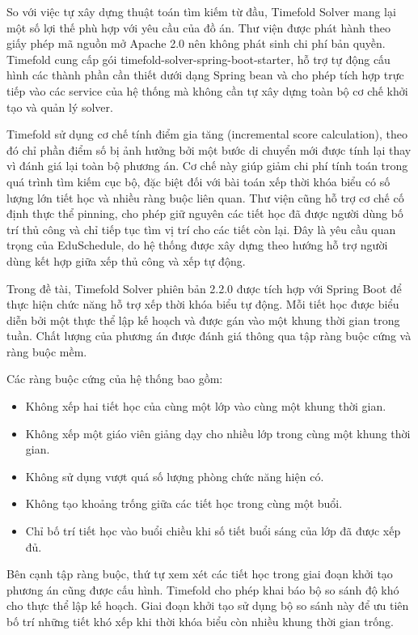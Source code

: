 \documentclass[../DoAn.tex]{subfiles}
\begin{document}
So với việc tự xây dựng thuật toán tìm kiếm từ đầu, Timefold Solver mang lại một số lợi thế phù hợp với yêu cầu của đồ án. Thư viện được phát hành theo giấy phép mã nguồn mở Apache 2.0 nên không phát sinh chi phí bản quyền. Timefold cung cấp gói timefold-solver-spring-boot-starter, hỗ trợ tự động cấu hình các thành phần cần thiết dưới dạng Spring bean và cho phép tích hợp trực tiếp vào các service của hệ thống mà không cần tự xây dựng toàn bộ cơ chế khởi tạo và quản lý solver.

Timefold sử dụng cơ chế tính điểm gia tăng (incremental score calculation), theo đó chỉ phần điểm số bị ảnh hưởng bởi một bước di chuyển mới được tính lại thay vì đánh giá lại toàn bộ phương án. Cơ chế này giúp giảm chi phí tính toán trong quá trình tìm kiếm cục bộ, đặc biệt đối với bài toán xếp thời khóa biểu có số lượng lớn tiết học và nhiều ràng buộc liên quan. Thư viện cũng hỗ trợ cơ chế cố định thực thể pinning, cho phép giữ nguyên các tiết học đã được người dùng bố trí thủ công và chỉ tiếp tục tìm vị trí cho các tiết còn lại. Đây là yêu cầu quan trọng của EduSchedule, do hệ thống được xây dựng theo hướng hỗ trợ người dùng kết hợp giữa xếp thủ công và xếp tự động.

Trong đề tài, Timefold Solver phiên bản 2.2.0 được tích hợp với Spring Boot để thực hiện chức năng hỗ trợ xếp thời khóa biểu tự động. Mỗi tiết học được biểu diễn bởi một thực thể lập kế hoạch và được gán vào một khung thời gian trong tuần. Chất lượng của phương án được đánh giá thông qua tập ràng buộc cứng và ràng buộc mềm.

Các ràng buộc cứng của hệ thống bao gồm:

\begin{itemize}[noitemsep]
\item Không xếp hai tiết học của cùng một lớp vào cùng một khung thời gian.
\item Không xếp một giáo viên giảng dạy cho nhiều lớp trong cùng một khung thời gian.
\item Không sử dụng vượt quá số lượng phòng chức năng hiện có.
\item Không tạo khoảng trống giữa các tiết học trong cùng một buổi.
\item Chỉ bố trí tiết học vào buổi chiều khi số tiết buổi sáng của lớp đã được xếp đủ.
\end{itemize}

Bên cạnh tập ràng buộc, thứ tự xem xét các tiết học trong giai đoạn khởi tạo phương án cũng được cấu hình. Timefold cho phép khai báo bộ so sánh độ khó cho thực thể lập kế hoạch. Giai đoạn khởi tạo sử dụng bộ so sánh này để ưu tiên bố trí những tiết khó xếp khi thời khóa biểu còn nhiều khung thời gian trống.
\end{document}
